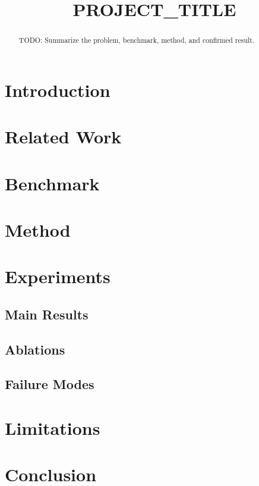\documentclass[10pt]{article}
\title{PROJECT_TITLE}
\author{}
\date{}
\begin{document}
\maketitle

\begin{abstract}
TODO: Summarize the problem, benchmark, method, and confirmed result.
\end{abstract}

\section{Introduction}

\section{Related Work}

\section{Benchmark}

\section{Method}

\section{Experiments}

\subsection{Main Results}

\subsection{Ablations}

\subsection{Failure Modes}

\section{Limitations}

\section{Conclusion}



\end{document}
